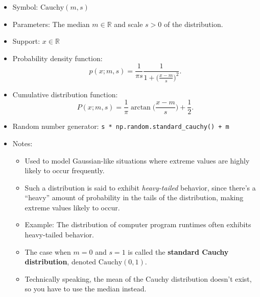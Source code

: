 \documentclass[
  letterpaper,
  DIV=11,
  numbers=noendperiod]{scrreprt}
\providecommand{\tightlist}{%
  \setlength{\itemsep}{0pt}\setlength{\parskip}{0pt}}\usepackage{longtable,booktabs,array}
\begin{document}
\begin{itemize}
\tightlist
\item
  Symbol: \(\text{Cauchy}(m, s)\)
\item
  Parameters: The median \(m \in \mathbb{R}\) and scale \(s > 0\) of the
  distribution.
\item
  Support: \(x \in \mathbb{R}\)
\item
  Probability density function:
  \[p(x; m, s) = \frac{1}{\pi s} \frac{1}{1 + \big(\frac{x-m}{s}\big)^2}.\]
\item
  Cumulative distribution function:
  \[P(x; m, s) = \frac{1}{\pi} \arctan \bigg(\frac{x-m}{s}\bigg) + \frac{1}{2}.\]
\item
  Random number generator:
  \texttt{s\ *\ np.random.standard\_cauchy()\ +\ m}
\item
  Notes:

  \begin{itemize}
  \tightlist
  \item
    Used to model Gaussian-like situations where extreme values are
    highly likely to occur frequently.
  \item
    Such a distribution is said to exhibit \emph{heavy-tailed} behavior,
    since there's a ``heavy'' amount of probability in the tails of the
    distribution, making extreme values likely to occur.
  \item
    Example: The distribution of computer program runtimes often
    exhibits heavy-tailed behavior.
  \item
    The case when \(m=0\) and \(s=1\) is called the \textbf{standard
    Cauchy distribution}, denoted \(\text{Cauchy}(0, 1)\).
  \item
    Technically speaking, the mean of the Cauchy distribution doesn't
    exist, so you have to use the median instead.
  \end{itemize}
\end{itemize}
\end{document}
